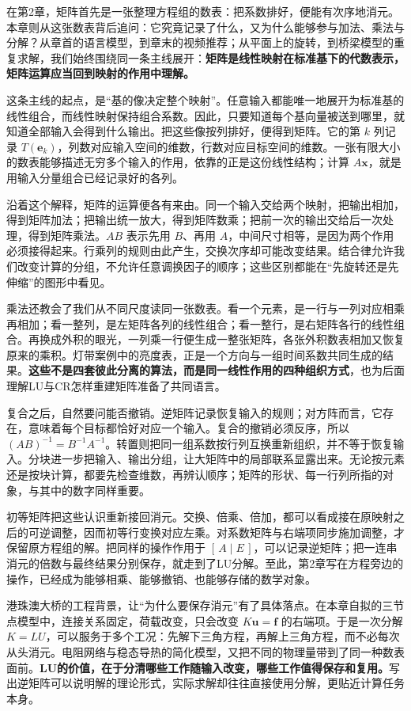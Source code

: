 \documentclass[a4paper,12pt,twoside,openany,fontset=none]{ctexbook}
\numberwithin{equation}{chapter}
\begin{document}
在第2章，矩阵首先是一张整理方程组的数表：把系数排好，便能有次序地消元。本章则从这张数表背后追问：它究竟记录了什么，又为什么能够参与加法、乘法与分解？从章首的语言模型，到章末的视频推荐；从平面上的旋转，到桥梁模型的重复求解，我们始终围绕同一条主线展开：\textbf{矩阵是线性映射在标准基下的代数表示，矩阵运算应当回到映射的作用中理解。}

这条主线的起点，是“基的像决定整个映射”。任意输入都能唯一地展开为标准基的线性组合，而线性映射保持组合系数。因此，只要知道每个基向量被送到哪里，就知道全部输入会得到什么输出。把这些像按列排好，便得到矩阵。它的第 $k$ 列记录 $T(\boldsymbol e_k)$，列数对应输入空间的维数，行数对应目标空间的维数。一张有限大小的数表能够描述无穷多个输入的作用，依靠的正是这份线性结构；计算 $A\boldsymbol x$，就是用输入分量组合已经记录好的各列。

沿着这个解释，矩阵的运算便各有来由。同一个输入交给两个映射，把输出相加，得到矩阵加法；把输出统一放大，得到矩阵数乘；把前一次的输出交给后一次处理，得到矩阵乘法。$AB$ 表示先用 $B$、再用 $A$，中间尺寸相等，是因为两个作用必须接得起来。行乘列的规则由此产生，交换次序却可能改变结果。结合律允许我们改变计算的分组，不允许任意调换因子的顺序；这些区别都能在“先旋转还是先伸缩”的图形中看见。

乘法还教会了我们从不同尺度读同一张数表。看一个元素，是一行与一列对应相乘再相加；看一整列，是左矩阵各列的线性组合；看一整行，是右矩阵各行的线性组合。再换成外积的眼光，一列乘一行便生成一整张矩阵，各张外积数表相加又恢复原来的乘积。灯带案例中的亮度表，正是一个方向与一组时间系数共同生成的结果。\textbf{这些不是四套彼此分离的算法，而是同一线性作用的四种组织方式}，也为后面理解LU与CR怎样重建矩阵准备了共同语言。

复合之后，自然要问能否撤销。逆矩阵记录恢复输入的规则；对方阵而言，它存在，意味着每个目标都恰好对应一个输入。复合的撤销必须反序，所以 $(AB)^{-1}=B^{-1}A^{-1}$。转置则把同一组系数按行列互换重新组织，并不等于恢复输入。分块进一步把输入、输出分组，让大矩阵中的局部联系显露出来。无论按元素还是按块计算，都要先检查维数，再辨认顺序；矩阵的形状、每一行列所指的对象，与其中的数字同样重要。

初等矩阵把这些认识重新接回消元。交换、倍乘、倍加，都可以看成接在原映射之后的可逆调整，因而初等行变换对应左乘。对系数矩阵与右端项同步施加调整，才保留原方程组的解。把同样的操作作用于 $[\,A\mid E\,]$，可以记录逆矩阵；把一连串消元的倍数与最终结果分别保存，就走到了LU分解。至此，第2章写在方程旁边的操作，已经成为能够相乘、能够撤销、也能够存储的数学对象。

港珠澳大桥的工程背景，让“为什么要保存消元”有了具体落点。在本章自拟的三节点模型中，连接关系固定，荷载改变，只会改变 $K\boldsymbol u=\boldsymbol f$ 的右端项。于是一次分解 $K=LU$，可以服务于多个工况：先解下三角方程，再解上三角方程，而不必每次从头消元。电阻网络与稳态导热的简化模型，又把不同的物理量带到了同一种数表面前。\textbf{LU的价值，在于分清哪些工作随输入改变，哪些工作值得保存和复用。}写出逆矩阵可以说明解的理论形式，实际求解却往往直接使用分解，更贴近计算任务本身。
\end{document}
